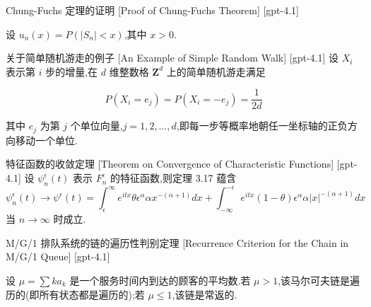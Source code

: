 \documentclass[UTF8]{ctexart}
\begin{document}
    
    
    \begin{prf}
        {Chung-Fuchs 定理的证明}
        [Proof of Chung-Fuchs Theorem]
        [gpt-4.1]
        
设 $u_n(x) = P(|S_n| < x)$,其中 $x > 0$.

    \end{prf}
    
    
    
    \begin{xmp}
        {关于简单随机游走的例子}
        [An Example of Simple Random Walk]
        [gpt-4.1]
        设 $X_i$ 表示第 $i$ 步的增量,在 $d$ 维整数格 $\mathbf{Z}^d$ 上的简单随机游走满足

\[
P(X_i = e_j) = P(X_i = -e_j) = \frac{1}{2d}
\]

其中 $e_j$ 为第 $j$ 个单位向量,$j=1,2,\ldots,d$,即每一步等概率地朝任一坐标轴的正负方向移动一个单位.
    \end{xmp}
    
    
    
    \begin{thm}
        {特征函数的收敛定理}
        [Theorem on Convergence of Characteristic Functions]
        [gpt-4.1]
        设 $\psi _ { n } ^ { \epsilon } ( t )$ 表示 $F _ { n } ^ { \epsilon }$ 的特征函数,则定理 3.17 蕴含
\[
\psi _ { n } ^ { \epsilon } ( t ) \to \psi ^ { \epsilon } ( t ) = \int _ { \epsilon } ^ { \infty } e ^ { i t x } \theta \epsilon ^ { \alpha } \alpha x ^ { - ( \alpha + 1 ) } d x + \int _ { - \infty } ^ { - \epsilon } e ^ { i t x } ( 1 - \theta ) \epsilon ^ { \alpha } \alpha | x | ^ { - ( \alpha + 1 ) } d x
\]
当 $n \to \infty$ 时成立.
    \end{thm}
    
    
    
    \begin{thm}
        {M/G/1 排队系统的链的遍历性判别定理}
        [Recurrence Criterion for the Chain in M/G/1 Queue]
        [gpt-4.1]
        
设 $\mu = \sum k a_{k}$ 是一个服务时间内到达的顾客的平均数.若 $\mu > 1$,该马尔可夫链是遍历的(即所有状态都是遍历的);若 $\mu \leq 1$,该链是常返的.

    \end{thm}
    
    
    
\end{document}
